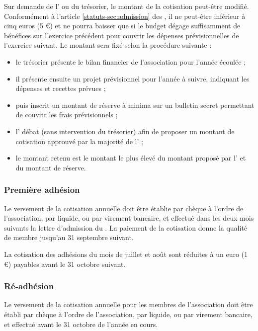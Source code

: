 \documentclass[a4paper,french,10pt]{article}
\newcounter{article}
\newcommand{\artrefst}[1]{article \ref{statuts-#1} des \statuts{}}
\begin{document}
Sur demande de l'\AG{} ou du trésorier, le montant de la cotisation peut-être modifié. Conformément à l'\artrefst{sec:admission}, il ne peut-être inférieur à cinq euros (5 \euro{}) et ne pourra baisser que si le budget dégage suffisamment de bénéfices sur l'exercice précédent pour couvrir les dépenses prévisionnelles de l'exercice suivant. Le montant sera fixé selon la procédure suivante :
\begin{itemize}
\item le trésorier présente le bilan financier de l'association pour l'année écoulée ;
\item il présente ensuite un projet prévisionnel pour l'année à suivre, indiquant les dépenses et recettes prévues ;
\item puis inscrit un montant de réserve à minima sur un bulletin secret permettant de couvrir les frais prévisionnels ;
\item l'\AG{} débat (sans intervention du trésorier) afin de proposer un montant de cotisation approuvé par la majorité de l'\AG{} ;
\item le montant retenu est le montant le plus élevé du montant proposé par l'\AG{} et du montant de réserve.
\end{itemize}

\subsubsection*{Première adhésion}

Le versement de la cotisation annuelle doit être établie par chèque à l'ordre de l'association, par liquide, ou par virement bancaire, et effectué dans les deux mois suivants la lettre d'admission du \bureau{}. La paiement de la cotisation donne la qualité de membre jusqu'au 31 septembre suivant.

La cotisation des adhésions du mois de juillet et août sont réduites à un euro (1  \euro{}) payables avant le 31 octobre suivant.

\subsubsection*{Ré-adhésion}

Le versement de la cotisation annuelle pour les membres de l'association doit être établi par chèque à l'ordre de l'association, par liquide, ou par virement bancaire, et effectué avant le 31 octobre de l'année en cours.
\end{document}
